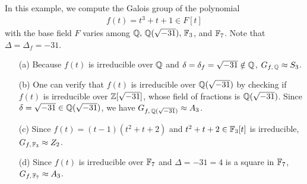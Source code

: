 \begin{exmp}
    In this example, we compute the Galois group of the polynomial
    \begin{align*}
        f(t)=t^3+t+1\in F[t]
    \end{align*}
    with the base field $F$ varies among ${\mathbb{Q}},\, {\mathbb{Q}}(\sqrt{-31}),\,{\mathbb{F}}_3$, and ${\mathbb{F}}_7$.
    Note that $\Delta=\Delta_f=-31$.
    \begin{enumerate}
        \item[(a)]
        {
            Because $f(t)$ is irreducible over ${\mathbb{Q}}$ and $\delta=\delta_f=\sqrt{-31}\notin{\mathbb{Q}}$, $G_{f,\,{\mathbb{Q}}}\approx S_3$.
        }
        \item[(b)]
        {
            One can verify that $f(t)$ is irreducible over ${\mathbb{Q}}(\sqrt{-31})$ by checking if $f(t)$ is irreducible over ${\mathbb{Z}}[\sqrt{-31}]$, whose field of fractions is ${\mathbb{Q}}(\sqrt{-31})$.
            Since $\delta=\sqrt{-31}\in{\mathbb{Q}}(\sqrt{-31})$, we have $G_{f,\,{\mathbb{Q}}(\sqrt{-31})}\approx A_3$.
        }
        \item[(c)]
        {
            Since $f(t)=(t-1)(t^2+t+2)$ and $t^2+t+2\in{\mathbb{F}}_3[t]$ is irreducible, $G_{f,\,{\mathbb{F}}_3}\approx Z_2$.
        }
        \item[(d)]
        {
            Since $f(t)$ is irreducible over ${\mathbb{F}}_7$ and $\Delta=-31=4$ is a square in ${\mathbb{F}}_7$, $G_{f,\,{\mathbb{F}}_7}\approx A_3$.
        }
    \end{enumerate}
\end{exmp}